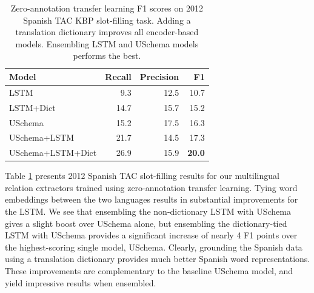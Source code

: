 \begin{table}
\begin{center}
\begin{tabular}{|lrrr|}
\hline
\bf Model & \bf Recall & \bf Precision & \bf F1 \\
\hline\hline
LSTM 		      &  9.3 & 12.5   & 10.7   \\
LSTM+Dict	      &  14.7 & 15.7  & 15.2   \\
USchema           &  15.2 & 17.5  & 16.3  \\
\hline\hline
USchema+LSTM       & 21.7 & 14.5  & 17.3  \\
USchema+LSTM+Dict  & 26.9 & 15.9  & \bf 20.0 \\
\hline
\end{tabular}
\caption{Zero-annotation transfer learning F1 scores on 2012 Spanish TAC KBP slot-filling task. Adding a translation dictionary improves all encoder-based models. Ensembling LSTM and USchema models performs the best. \label{es-tac-table}}
\end{center}
\end{table}


Table \ref{es-tac-table} presents 2012 Spanish TAC slot-filling results for our multilingual relation extractors trained using zero-annotation transfer learning. Tying word embeddings between the two languages results in substantial improvements for the LSTM. We see that ensembling the non-dictionary LSTM with USchema gives a slight boost over USchema alone, but ensembling the dictionary-tied LSTM with USchema provides a significant increase of nearly 4 F1 points over the highest-scoring single model, USchema. Clearly, grounding the Spanish data using a translation dictionary provides much better Spanish word representations. These improvements are complementary to the baseline USchema model, and yield impressive results when ensembled.

